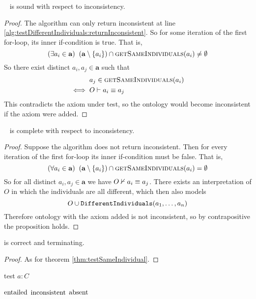 \documentclass[paper.tex]{subfiles}
\begin{document}
\begin{proposition}
  \sloppy~
   is sound with respect to inconsistency.
\end{proposition}
\begin{proof}
  The algorithm can only return inconsistent at line \ref{alg:testDifferentIndividuals:returnInconsistent}.  So for some iteration of the first for-loop, its inner if-condition is true.  That is,
  \[ (\exists a_i \in \mathbf{a}) \;\; (\mathbf{a} \setminus \{a_i\}) \intersect \Call{getSameIndividuals}{a_i} \ne \emptyset \]
  So there exist distinct $a_i, a_j \in \mathbf{a}$ such that
  \begin{align*}
    & a_j \in \Call{getSameIndividuals}{a_i} \\
    \iff{}& O \sementails a_i \equiv a_j
  \end{align*}
  This contradicts the axiom under test, so the ontology would become inconsistent if the axiom were added.
\end{proof}

\begin{proposition}
  \sloppy~
   is complete with respect to inconsistency.
\end{proposition}
\begin{proof}
  Suppose the algorithm does not return inconsistent.  Then for every iteration of the first for-loop its inner if-condition must be false.  That is,
  \[ (\forall a_i \in \mathbf{a}) \;\; (\mathbf{a} \setminus \{a_i\}) \intersect \Call{getSameIndividuals}{a_i} = \emptyset \]
  So for all distinct $a_i, a_j \in \mathbf{a}$ we have $O \nvdash a_i \equiv a_j$.  There exists an interpretation of $O$ in which the individuals are all different, which then also models
  \[ O \cup \mathtt{DifferentIndividuals}(a_1, \ldots, a_n) \]
  Therefore ontology with the axiom added is not inconsistent, so by contrapositive the proposition holds.
\end{proof}

\begin{theorem}
   is correct and terminating.
\end{theorem}
\begin{proof}
  As for theorem \ref{thm:testSameIndividual}.
\end{proof}


\begin{algorithm}[H]
  \caption{test $a : C$}
  \begin{algorithmic}[1]
    \raggedright
        \State \Return $\mathrm{entailed}$
        \label{alg:testClassAssertion:returnEntailed}
        \State \Return $\mathrm{inconsistent}$
        \label{alg:testClassAssertion:returnInconsistent}
      \Else
        \State \Return $\mathrm{absent}$
      \EndIf
    \EndFunction
  \end{algorithmic}
\end{algorithm}
\end{document}
